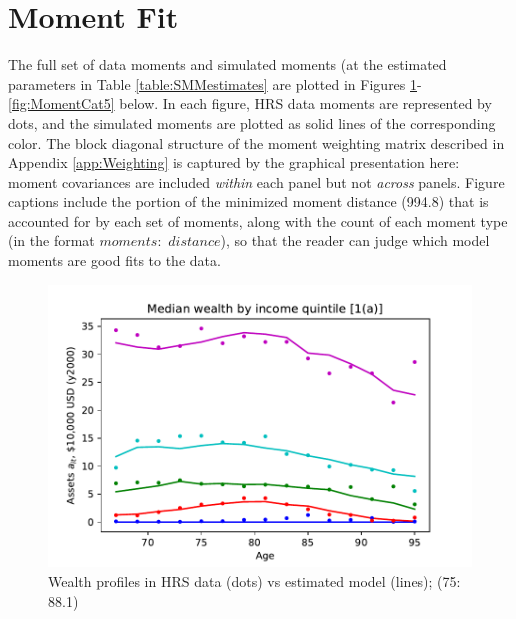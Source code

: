 \documentclass[12pt,pdftex,letterpaper]{article}
\begin{document}
\section{Moment Fit}
\label{app:MomentFit}

The full set of data moments and simulated moments (at the estimated parameters in Table \ref{table:SMMestimates} are plotted in Figures \ref{fig:MomentCat1}-\ref{fig:MomentCat5} below.  In each figure, HRS data moments are represented by dots, and the simulated moments are plotted as solid lines of the corresponding color.  The block diagonal structure of the moment weighting matrix described in Appendix \ref{app:Weighting} is captured by the graphical presentation here: moment covariances are included \textit{within} each panel but not \textit{across} panels.  Figure captions include the portion of the minimized moment distance (994.8) that is accounted for by each set of moments, along with the count of each moment type (in the format $moments:$ $distance$), so that the reader can judge which model moments are good fits to the data.

\begin{figure}[h!]
\begin{center}
\includegraphics{../Figures/WealthByIncAge.pdf}
\end{center}
\vspace{-0.5cm}
\caption{Wealth profiles in HRS data (dots) vs estimated model (lines); (75: 88.1)}
\label{fig:MomentCat1}
\end{figure}

\newpage
\end{document}
